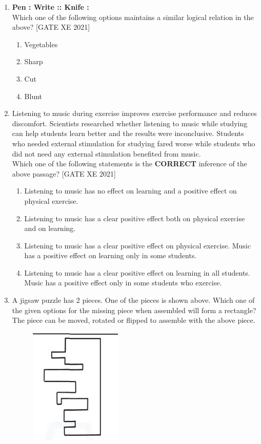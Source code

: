 \documentclass[journal,12pt,onecolumn]{IEEEtran}
\theoremstyle{remark}
\begin{document}
\begin{enumerate}
  \item \textbf{Pen : Write :: Knife : \underline{\hspace{1.5cm}}}\\
  Which one of the following options maintains a similar logical relation in the above? \hfill[GATE XE 2021]

  \begin{multicols}{2}
  \begin{enumerate}
    \item Vegetables
    \item Sharp
    \item Cut
    \item Blunt
  \end{enumerate}
  \end{multicols}

  \item Listening to music during exercise improves exercise performance and reduces discomfort. Scientists researched whether listening to music while studying can help students learn better and the results were inconclusive. Students who needed external stimulation for studying fared worse while students who did not need any external stimulation benefited from music.\\
  Which one of the following statements is the \textbf{CORRECT} inference of the above passage? \hfill[GATE XE 2021]

  \begin{multicols}{2}
  \begin{enumerate}
    \item Listening to music has no effect on learning and a positive effect on physical exercise.
    \item Listening to music has a clear positive effect both on physical exercise and on learning.
    \item Listening to music has a clear positive effect on physical exercise. Music has a positive effect on learning only in some students.
    \item Listening to music has a clear positive effect on learning in all students. Music has a positive effect only in some students who exercise.
  \end{enumerate}
  \end{multicols}

  \item A jigsaw puzzle has 2 pieces. One of the pieces is shown above. Which one of the given options for the missing piece when assembled will form a rectangle? The piece can be moved, rotated or flipped to assemble with the above piece. 
\begin{figure}[H]
      \centering
      \includegraphics[width=0.2\columnwidth]{figs/fig3.png}
      \caption{}
      \label{fig:placeholder}
  \end{figure}
  

\end{enumerate}
\end{document}
